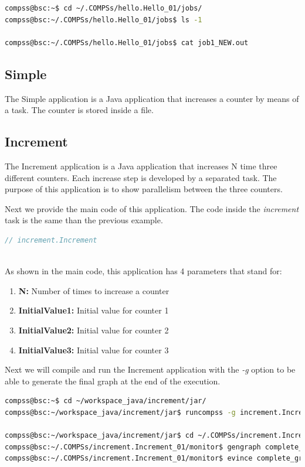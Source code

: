 \begin{lstlisting}[language=bash]
compss@bsc:~$ cd ~/.COMPSs/hello.Hello_01/jobs/
compss@bsc:~/.COMPSs/hello.Hello_01/jobs$ ls -1

compss@bsc:~/.COMPSs/hello.Hello_01/jobs$ cat job1_NEW.out

\end{lstlisting}

\subsection{Simple}
The Simple application is a Java application that increases a counter by means of a task. The counter is stored inside a file.


\subsection{Increment}
The Increment application is a Java application that increases N time three different counters. Each increase step is developed by a separated task. The
purpose of this application is to show parallelism between the three counters.

Next we provide the main code of this application. The code inside the \textit{increment} task is the same than the previous example. 

\begin{lstlisting}[language=java]
	// increment.Increment
	
\end{lstlisting}

As shown in the main code, this application has 4 parameters that stand for:

\begin{enumerate}
 \item \textbf{N:} Number of times to increase a counter
 \item \textbf{InitialValue1:} Initial value for counter 1
 \item \textbf{InitialValue2:} Initial value for counter 2
 \item \textbf{InitialValue3:} Initial value for counter 3
\end{enumerate}

Next we will compile and run the Increment application with the \textit{-g} option to be able to generate the final graph at the end of the execution.

\begin{lstlisting}[language=bash]
compss@bsc:~$ cd ~/workspace_java/increment/jar/
compss@bsc:~/workspace_java/increment/jar$ runcompss -g increment.Increment 10 1 2 3 

compss@bsc:~/workspace_java/increment/jar$ cd ~/.COMPSs/increment.Increment_01/monitor/
compss@bsc:~/.COMPSs/increment.Increment_01/monitor$ gengraph complete_graph.dot
compss@bsc:~/.COMPSs/increment.Increment_01/monitor$ evince complete_graph.dot.pdf
\end{lstlisting}

